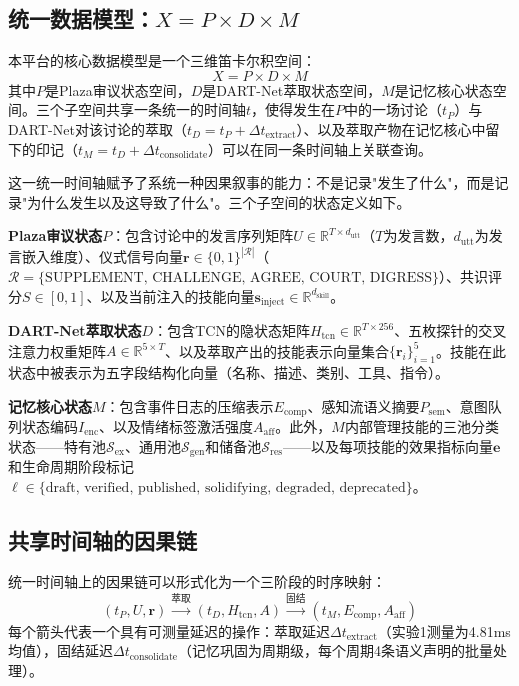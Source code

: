 \documentclass[12pt,a4paper]{ctexart}
\def\R{\mathbb{R}}
\begin{document}
\subsection{统一数据模型：$X = P \times D \times M$}

本平台的核心数据模型是一个三维笛卡尔积空间：
\begin{equation}
X = P \times D \times M
\label{eq:unified_model}
\end{equation}
其中$P$是Plaza审议状态空间，$D$是DART-Net萃取状态空间，$M$是记忆核心状态空间。三个子空间共享一条统一的时间轴$t$，使得发生在$P$中的一场讨论（$t_P$）与DART-Net对该讨论的萃取（$t_D = t_P + \Delta t_{\text{extract}}$）、以及萃取产物在记忆核心中留下的印记（$t_M = t_D + \Delta t_{\text{consolidate}}$）可以在同一条时间轴上关联查询。

这一统一时间轴赋予了系统一种因果叙事的能力：不是记录"发生了什么"，而是记录"为什么发生以及这导致了什么"。三个子空间的状态定义如下。

\textbf{Plaza审议状态$P$}：包含讨论中的发言序列矩阵$U \in \R^{T \times d_{\text{utt}}}$（$T$为发言数，$d_{\text{utt}}$为发言嵌入维度）、仪式信号向量$\mathbf{r} \in \{0,1\}^{|\mathcal{R}|}$（$\mathcal{R} = \{\text{SUPPLEMENT, CHALLENGE, AGREE, COURT, DIGRESS}\}$）、共识评分$S \in [0,1]$、以及当前注入的技能向量$\mathbf{s}_{\text{inject}} \in \R^{d_{\text{skill}}}$。

\textbf{DART-Net萃取状态$D$}：包含TCN的隐状态矩阵$H_{\text{tcn}} \in \R^{T \times 256}$、五枚探针的交叉注意力权重矩阵$A \in \R^{5 \times T}$、以及萃取产出的技能表示向量集合$\{\mathbf{r}_i\}_{i=1}^{5}$。技能在此状态中被表示为五字段结构化向量（名称、描述、类别、工具、指令）。

\textbf{记忆核心状态$M$}：包含事件日志的压缩表示$E_{\text{comp}}$、感知流语义摘要$P_{\text{sem}}$、意图队列状态编码$I_{\text{enc}}$、以及情绪标签激活强度$A_{\text{aff}}$。此外，$M$内部管理技能的三池分类状态——特有池$\mathcal{S}_{\text{ex}}$、通用池$\mathcal{S}_{\text{gen}}$和储备池$\mathcal{S}_{\text{res}}$——以及每项技能的效果指标向量$\mathbf{e}$和生命周期阶段标记$\ell \in \{\text{draft, verified, published, solidifying, degraded, deprecated}\}$。

\subsection{共享时间轴的因果链}

统一时间轴上的因果链可以形式化为一个三阶段的时序映射：
\begin{equation}
(t_P, U, \mathbf{r}) \xrightarrow{\text{萃取}} (t_D, H_{\text{tcn}}, A) \xrightarrow{\text{固结}} (t_M, E_{\text{comp}}, A_{\text{aff}})
\label{eq:causal_chain}
\end{equation}
每个箭头代表一个具有可测量延迟的操作：萃取延迟$\Delta t_{\text{extract}}$（实验1测量为4.81ms均值），固结延迟$\Delta t_{\text{consolidate}}$（记忆巩固为周期级，每个周期4条语义声明的批量处理）。
\end{document}
